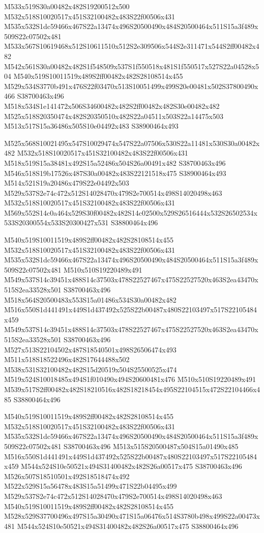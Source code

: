 \documentclass{article}
\begin{document}
\begin{multicols}{2}
M533x519S30a00482x482S19200512x500 M532x518S10020517x451S32100482x483S22f00506x431 M535x532S1dc59466x467S22a13474x496S20500490x484S20500464x511S15a3f489x509S22c07502x481 M533x567S10619468x512S10611510x512S2e309506x544S2e311471x544S2ff00482x482 M542x561S30a00482x482S1f548509x537S1f550518x481S1f550517x527S22a04528x504 M540x519S10011519x489S2ff00482x482S28108514x455 M529x534S3770b491x476S22f03470x513S10051499x499S20e00481x502S37800490x466 S38700463x496 M518x534S1e141472x506S34600482x482S2ff00482x482S30e00482x482 M525x518S20350474x482S20350510x482S22a04511x503S22a14475x503 M513x517S15a36486x505S10e04492x483 S38900464x493

M525x568S10021495x547S10029474x547S22a07506x530S22a11481x530S30a00482x482 M532x518S10020517x451S32100482x483S22f00506x431 M518x519S15a38481x492S15a52486x504S26a00491x482 S38700463x496 M546x518S19b17526x487S30a00482x483S22121518x475 S38900464x493 M514x521S19a20486x479S22e04492x503 M529x537S2e74c472x512S14028470x479S2e700514x498S14020498x463 M532x518S10020517x451S32100482x483S22f00506x431 M569x552S14c0a464x529S30f00482x482S14c02500x529S26516444x532S26502534x533S20300554x533S20300427x531 S38800464x496

M540x519S10011519x489S2ff00482x482S28108514x455 M532x518S10020517x451S32100482x483S22f00506x431 M535x532S1dc59466x467S22a13474x496S20500490x484S20500464x511S15a3f489x509S22c07502x481 M510x510S19220489x491 M549x537S14c39451x488S14c37503x478S22527467x475S22527520x463S2ea43470x515S2ea33528x501 S38700463x496 M518x564S20500483x553S15a01486x534S30a00482x482 M516x550S1d441491x449S1d437492x525S22b00487x480S22103497x517S22105484x459 M549x537S14c39451x488S14c37503x478S22527467x475S22527520x463S2ea43470x515S2ea33528x501 S38700463x496 M527x513S22104502x487S18540501x498S26506474x493 M511x518S18522496x482S17644488x502 M538x531S32100482x482S15d20519x504S25500525x474 M519x524S10018485x494S1f010490x494S20600481x476 M510x510S19220489x491 M539x517S2ff00482x482S18210516x482S18218454x495S22104515x472S22104466x485 S38800464x496

M540x519S10011519x489S2ff00482x482S28108514x455 M532x518S10020517x451S32100482x483S22f00506x431 M535x532S1dc59466x467S22a13474x496S20500490x484S20500464x511S15a3f489x509S22c07502x481 S38700463x496 M513x515S20500487x504S15a01490x485 M516x550S1d441491x449S1d437492x525S22b00487x480S22103497x517S22105484x459 M544x524S10e50521x494S31400482x482S26a00517x475 S38700463x496 M526x507S18510501x492S18518474x492 M522x529S15a56478x483S15a51499x471S22b04495x499 M529x537S2e74c472x512S14028470x479S2e700514x498S14020498x463 M540x519S10011519x489S2ff00482x482S28108514x455 M528x529S37700496x497S15a30490x471S15a06476x514S3780b498x499S22a00473x481 M544x524S10e50521x494S31400482x482S26a00517x475 S38800464x496


\end{multicols}
\end{document}
